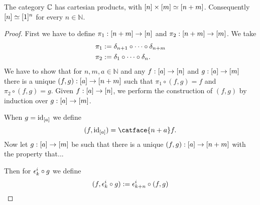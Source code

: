 \documentclass{article}
\begin{document}
\begin{thm}
The category $\mathbb{C}$ has cartesian products, with $[n]\times[m]\simeq
[n+m]$. Consequently $[n]\simeq[1]^n$ for every $n\in\mathbb{N}$.
\end{thm}

\begin{proof}
First we have to define $\pi_1:[n+m]\to[n]$ and $\pi_2:[n+m]\to[m]$.
We take
\begin{align*}
\pi_1 & := \delta_{n+1}\circ\cdots\circ\delta_{n+m}\\
\pi_2 & := \delta_{1}\circ\cdots\circ\delta_{n}.
\end{align*}
We have to show that for $n,m,a\in\mathbb{N}$ and any $f:[a]\to[n]$
and $g:[a]\to[m]$ there is a unique $(f,g):[a]\to[n+m]$
such that $\pi_1\circ(f,g)=f$ and $\pi_2\circ(f,g)=g$. Given 
$f:[a]\to[n]$, we perform the construction of $(f,g)$ by
induction over $g:[a]\to[m]$. 

When $g=\mathrm{id}_{[a]}$ we define
\begin{equation*}
(f,\catid{\cubobj{a}})=\catface{n+a}f.
\end{equation*} 
Now let $g:[a]\to[m]$ be such that there is a unique
$(f,g):[a]\to[n+m]$ with the property that...

Then for $\epsilon_{k}^{i}\circ g$ we define
\begin{equation*}
(f,\epsilon_{k}^{i}\circ g):= \epsilon_{k+n}^{i}\circ(f,g) 
\end{equation*}
\end{proof}
\end{document}
